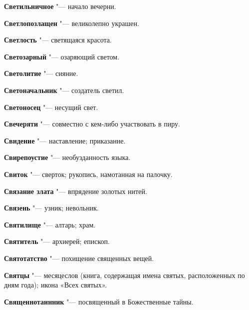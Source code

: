 \begin{mymulticols}{2}
\noindent\textbf{Светильничное} "--- начало вечерни. 




\noindent\textbf{Светлопозлащен} "--- великолепно украшен. 




\noindent\textbf{Светлость} "--- светящаяся красота. 




\noindent\textbf{Светозарный} "--- озаряющий светом. 




\noindent\textbf{Светолитие} "--- сияние. 




\noindent\textbf{Светоначальник} "--- создатель светил. 




\noindent\textbf{Светоносец} "--- несущий свет. 




\noindent\textbf{Свечеряти} "--- совместно с кем-либо участвовать в пиру. 




\noindent\textbf{Свидение} "--- наставление; приказание. 




\noindent\textbf{Свирепоустие} "--- необузданность языка. 




\noindent\textbf{Свиток} "--- сверток; рукопись, намотанная на палочку. 




\noindent\textbf{Связание злата} "--- впрядение золотых нитей. 




\noindent\textbf{Связень} "--- узник; невольник. 




\noindent\textbf{Святилище} "--- алтарь; храм. 




\noindent\textbf{Святитель} "--- архиерей; епископ. 




\noindent\textbf{Святотатство} "--- похищение священных вещей. 




\noindent\textbf{Святцы} "--- месяцеслов (книга, содержащая имена святых, расположенных по дням года); икона «Всех святых». 




\noindent\textbf{Священнотаинник} "--- посвященный в Божественные тайны. 





\end{mymulticols}
